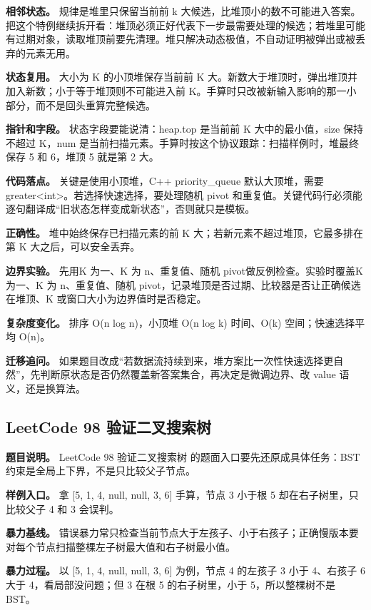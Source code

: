 \textbf{相邻状态。} 规律是堆里只保留当前前 k 大候选，比堆顶小的数不可能进入答案。把这个特例继续拆开看：堆顶必须正好代表下一步最需要处理的候选；若堆里可能有过期对象，读取堆顶前要先清理。堆只解决动态极值，不自动证明被弹出或被丢弃的元素无用。

\textbf{状态复用。} 大小为 K 的小顶堆保存当前前 K 大。新数大于堆顶时，弹出堆顶并加入新数；小于等于堆顶则不可能进入前 K。手算时只改被新输入影响的那一小部分，而不是回头重算完整候选。

\textbf{指针和字段。} 状态字段要能说清：heap.top 是当前前 K 大中的最小值，size 保持不超过 K，num 是当前扫描元素。手算时按这个协议跟踪：扫描样例时，堆最终保存 5 和 6，堆顶 5 就是第 2 大。

\textbf{代码落点。} 关键是使用小顶堆，C++ priority\_queue 默认大顶堆，需要 greater<int>。若选择快速选择，要处理随机 pivot 和重复值。关键代码行必须能逐句翻译成“旧状态怎样变成新状态”，否则就只是模板。

\textbf{正确性。} 堆中始终保存已扫描元素的前 K 大；若新元素不超过堆顶，它最多排在第 K 大之后，可以安全丢弃。

\textbf{边界实验。} 先用K 为一、K 为 n、重复值、随机 pivot做反例检查。实验时覆盖K 为一、K 为 n、重复值、随机 pivot，记录堆顶是否过期、比较器是否让正确候选在堆顶、K 或窗口大小为边界值时是否稳定。

\textbf{复杂度变化。} 排序 O(n log n)，小顶堆 O(n log k) 时间、O(k) 空间；快速选择平均 O(n)。

\textbf{迁移追问。} 如果题目改成“若数据流持续到来，堆方案比一次性快速选择更自然”，先判断原状态是否仍然覆盖新答案集合，再决定是微调边界、改 value 语义，还是换算法。

\subsection{LeetCode 98 验证二叉搜索树}

\textbf{题目说明。} LeetCode 98 验证二叉搜索树 的题面入口要先还原成具体任务：BST 约束是全局上下界，不是只比较父子节点。

\textbf{样例入口。} 拿 [5, 1, 4, null, null, 3, 6] 手算，节点 3 小于根 5 却在右子树里，只比较父子 4 和 3 会误判。

\textbf{暴力基线。} 错误暴力常只检查当前节点大于左孩子、小于右孩子；正确慢版本要对每个节点扫描整棵左子树最大值和右子树最小值。

\textbf{暴力过程。} 以 [5, 1, 4, null, null, 3, 6] 为例，节点 4 的左孩子 3 小于 4、右孩子 6 大于 4，看局部没问题；但 3 在根 5 的右子树里，小于 5，所以整棵树不是 BST。

